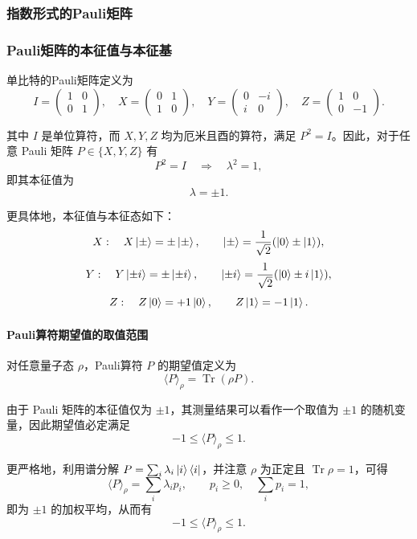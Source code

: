 \subsubsection{指数形式的Pauli矩阵}

\subsubsection{Pauli矩阵的本征值与本征基}

单比特的Pauli矩阵定义为
\[
  I=
  \begin{pmatrix}1&0\\0&1
  \end{pmatrix},\quad
  X=
  \begin{pmatrix}0&1\\1&0
  \end{pmatrix},\quad
  Y=
  \begin{pmatrix}0&-i\\ i&0
  \end{pmatrix},\quad
  Z=
  \begin{pmatrix}1&0\\0&-1
  \end{pmatrix}.
\]

其中 $I$ 是单位算符，而 $X,Y,Z$ 均为厄米且酉的算符，满足 $P^2=I$。因此，对于任意 Pauli 矩阵 $P\in\{X,Y,Z\}$ 有
\[
  P^2=I \quad \Rightarrow \quad \lambda^2=1,
\]
即其本征值为
\[
  \boxed{\lambda=\pm 1}.
\]

更具体地，本征值与本征态如下：
\[
  X:\quad X\left| \pm \right\rangle=\pm\left| \pm \right\rangle,\qquad
  \left| \pm \right\rangle=\frac{1}{\sqrt{2}}(\left| 0 \right\rangle\pm\left| 1 \right\rangle),
\]
\[
  Y:\quad Y\left| \pm i \right\rangle=\pm\left| \pm i \right\rangle,\qquad
  \left| \pm i \right\rangle=\frac{1}{\sqrt{2}}(\left| 0 \right\rangle\pm i\left| 1 \right\rangle),
\]
\[
  Z:\quad Z\left| 0 \right\rangle=+1\left| 0 \right\rangle,\qquad Z\left| 1 \right\rangle=-1\left| 1 \right\rangle.
\]

\paragraph{Pauli算符期望值的取值范围}

对任意量子态 $\rho$，Pauli算符 $P$ 的期望值定义为
\[
  \langle P\rangle_\rho = \operatorname{Tr}(\rho P).
\]

由于 Pauli 矩阵的本征值仅为 $\pm 1$，其测量结果可以看作一个取值为 $\pm 1$ 的随机变量，因此期望值必定满足
\[
  -1 \leq \langle P\rangle_\rho \leq 1.
\]

更严格地，利用谱分解 $P=\sum_i \lambda_i\left| i \right\rangle\left\langle i \right|$，并注意 $\rho$ 为正定且
$\operatorname{Tr}\rho=1$，可得
\[
  \langle P\rangle_\rho = \sum_i \lambda_i p_i,\qquad p_i\ge 0,\quad
  \sum_i p_i=1,
\]
即为 $\pm 1$ 的加权平均，从而有
\[
  \boxed{-1 \leq \langle P\rangle_\rho \leq 1}.
\]

